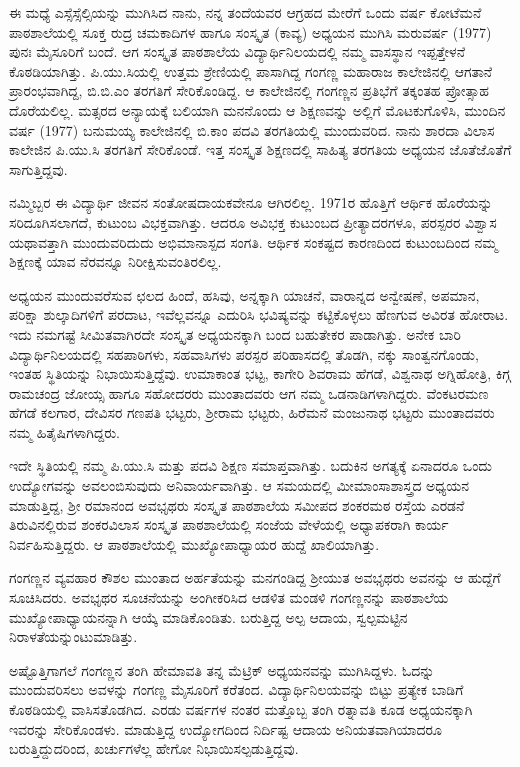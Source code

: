 {ಈ ಮಧ್ಯೆ ಎಸ್ಸೆಸ್ಸೆಲ್ಸಿಯನ್ನು ಮುಗಿಸಿದ ನಾನು, ನನ್ನ ತಂದೆಯವರ ಆಗ್ರಹದ ಮೇರೆಗೆ ಒಂದು ವರ್ಷ ಕೋಟೆಮನೆ ಪಾಠಶಾಲೆಯಲ್ಲಿ ಸೂಕ್ತ  \enginline{-}  ರುದ್ರ  \enginline{-}  ಚಮಕಾದಿಗಳ ಹಾಗೂ ಸಂಸ್ಕೃತ (ಕಾವ್ಯ) ಅಧ್ಯಯನ ಮುಗಿಸಿ ಮರುವರ್ಷ (1977) ಪುನಃ ಮೈಸೂರಿಗೆ ಬಂದೆ. ಆಗ ಸಂಸ್ಕೃತ ಪಾಠಶಾಲೆಯ ವಿದ್ಯಾರ್ಥಿನಿಲಯದಲ್ಲಿ ನಮ್ಮ ವಾಸಸ್ಥಾನ ಇಪ್ಪತ್ತೇಳನೆ ಕೊಠಡಿಯಾಗಿತ್ತು. ಪಿ.ಯು.ಸಿಯಲ್ಲಿ ಉತ್ತಮ ಶ್ರೇಣಿಯಲ್ಲಿ ಪಾಸಾಗಿದ್ದ ಗಂಗಣ್ಣ ಮಹಾರಾಜ ಕಾಲೇಜಿನಲ್ಲಿ ಆಗತಾನೆ ಪ್ರಾರಂಭವಾಗಿದ್ದ, ಬಿ.ಬಿ.ಎಂ ತರಗತಿಗೆ ಸೇರಿಕೊಂಡಿದ್ದ. ಆ ಕಾಲೇಜಿನಲ್ಲಿ ಗಂಗಣ್ಣನ ಪ್ರತಿಭೆಗೆ ತಕ್ಕಂತಹ ಪ್ರೋತ್ಸಾಹ ದೊರೆಯಲಿಲ್ಲ. ಮತ್ಸರದ ಅನ್ಯಾಯಕ್ಕೆ ಬಲಿಯಾಗಿ ಮನನೊಂದು ಆ ಶಿಕ್ಷಣವನ್ನು ಅಲ್ಲಿಗೆ ಮೊಟಕುಗೊಳಿಸಿ, ಮುಂದಿನ ವರ್ಷ (1977) ಬನುಮಯ್ಯ ಕಾಲೇಜಿನಲ್ಲಿ ಬಿ.ಕಾಂ ಪದವಿ ತರಗತಿಯಲ್ಲಿ ಮುಂದುವರಿದ. ನಾನು ಶಾರದಾ ವಿಲಾಸ ಕಾಲೇಜಿನ ಪಿ.ಯು.ಸಿ ತರಗತಿಗೆ ಸೇರಿಕೊಂಡೆ. ಇತ್ತ ಸಂಸ್ಕೃತ ಶಿಕ್ಷಣದಲ್ಲಿ ಸಾಹಿತ್ಯ ತರಗತಿಯ ಅಧ್ಯಯನ ಜೊತೆಜೊತೆಗೆ ಸಾಗುತ್ತಿದ್ದವು. 

ನಮ್ಮಿಬ್ಬರ ಈ ವಿದ್ಯಾರ್ಥಿ ಜೀವನ ಸಂತೋಷದಾಯಕವೇನೂ ಆಗಿರಲಿಲ್ಲ. 1971ರ ಹೊತ್ತಿಗೆ ಆರ್ಥಿಕ ಹೊರೆಯನ್ನು ಸರಿದೂಗಿಸಲಾಗದೆ, ಕುಟುಂಬ	ವಿಭಕ್ತವಾಗಿತ್ತು. ಆದರೂ ಅವಿಭಕ್ತ ಕುಟುಂಬದ ಪ್ರೀತ್ಯಾದರಗಳೂ, ಪರಸ್ಪರರ ವಿಶ್ವಾಸ ಯಥಾವತ್ತಾಗಿ ಮುಂದುವರಿದುದು ಅಭಿಮಾನಾಸ್ಪದ ಸಂಗತಿ. ಆರ್ಥಿಕ ಸಂಕಷ್ಟದ ಕಾರಣದಿಂದ ಕುಟುಂಬದಿಂದ ನಮ್ಮ ಶಿಕ್ಷಣಕ್ಕೆ ಯಾವ ನೆರವನ್ನೂ ನಿರೀಕ್ಷಿಸುವಂತಿರಲಿಲ್ಲ.

ಅಧ್ಯಯನ ಮುಂದುವರೆಸುವ ಛಲದ ಹಿಂದೆ, ಹಸಿವು, ಅನ್ನಕ್ಕಾಗಿ ಯಾಚನೆ, ವಾರಾನ್ನದ ಅನ್ವೇಷಣೆ, ಅಪಮಾನ, ಪರಿಕ್ಷಾ ಶುಲ್ಕಾದಿಗಳಿಗೆ ಪರದಾಟ, ಇವೆಲ್ಲವನ್ನೂ ಎದುರಿಸಿ ಭವಿಷ್ಯವನ್ನು ಕಟ್ಟಿಕೊಳ್ಳಲು ಹೆಣಗುವ ಅವಿರತ ಹೋರಾಟ. ಇದು ನಮಗಷ್ಟೆ ಸೀಮಿತವಾಗಿರದೇ ಸಂಸ್ಕೃತ ಅಧ್ಯಯನಕ್ಕಾಗಿ ಬಂದ ಬಹುತೇಕರ ಪಾಡಾಗಿತ್ತು. ಅನೇಕ ಬಾರಿ ವಿದ್ಯಾರ್ಥಿನಿಲಯದಲ್ಲಿ ಸಹಪಾಠಿಗಳು, ಸಹವಾಸಿಗಳು ಪರಸ್ಪರ ಪರಿಹಾಸದಲ್ಲಿ ತೊಡಗಿ, ನಕ್ಕು ಸಾಂತ್ವನಗೊಂಡು, ಇಂತಹ ಸ್ಥಿತಿಯನ್ನು ನಿಭಾಯಿಸುತ್ತಿದ್ದೆವು. ಉಮಾಕಾಂತ ಭಟ್ಟ, ಕಾಗೇರಿ ಶಿವರಾಮ ಹೆಗಡೆ, ವಿಶ್ವನಾಥ ಅಗ್ನಿಹೋತ್ರಿ, ಕಿಗ್ಗ ರಾಮಚಂದ್ರ ಜೋಯ್ಸ ಹಾಗೂ ಸಹೋದರರು ಮುಂತಾದವರು ಆಗ ನಮ್ಮ ಒಡನಾಡಿಗಳಾಗಿದ್ದರು. ವೆಂಕಟರಮಣ ಹೆಗಡೆ ಕಲಗಾರ, ದೇವಿಸರ ಗಣಪತಿ ಭಟ್ಟರು, ಶ್ರೀರಾಮ ಭಟ್ಟರು, ಹಿರೆಮನೆ ಮಂಜುನಾಥ ಭಟ್ಟರು ಮುಂತಾದವರು ನಮ್ಮ ಹಿತೈಷಿಗಳಾಗಿದ್ದರು.

ಇದೇ ಸ್ಥಿತಿಯಲ್ಲಿ ನಮ್ಮ ಪಿ.ಯು.ಸಿ ಮತ್ತು ಪದವಿ ಶಿಕ್ಷಣ ಸಮಾಪ್ತವಾಗಿತ್ತು. ಬದುಕಿನ ಅಗತ್ಯಕ್ಕೆ ಏನಾದರೂ ಒಂದು  ಉದ್ಯೋಗವನ್ನು ಅವಲಂಬಿಸುವುದು ಅನಿವಾರ್ಯವಾಗಿತ್ತು. ಆ ಸಮಯದಲ್ಲಿ ಮೀಮಾಂಸಾಶಾಸ್ತ್ರದ ಅಧ್ಯಯನ ಮಾಡುತ್ತಿದ್ದ, ಶ್ರೀ ರಮಾನಂದ ಅವಭೃಥರು ಸಂಸ್ಕೃತ ಪಾಠಶಾಲೆಯ ಸಮೀಪದ ಶಂಕರಮಠ ರಸ್ತೆಯ ಎರಡನೆ ತಿರುವಿನಲ್ಲಿರುವ ಶಂಕರವಿಲಾಸ ಸಂಸ್ಕೃತ ಪಾಠಶಾಲೆಯಲ್ಲಿ ಸಂಜೆಯ ವೇಳೆಯಲ್ಲಿ ಅಧ್ಯಾಪಕರಾಗಿ ಕಾರ್ಯ ನಿರ್ವಹಿಸುತ್ತಿದ್ದರು. ಆ ಪಾಠಶಾಲೆಯಲ್ಲಿ ಮುಖ್ಯೋಪಾಧ್ಯಾಯರ ಹುದ್ದೆ ಖಾಲಿಯಾಗಿತ್ತು. 

ಗಂಗಣ್ಣನ ವ್ಯವಹಾರ ಕೌಶಲ ಮುಂತಾದ ಅರ್ಹತೆಯನ್ನು ಮನಗಂಡಿದ್ದ ಶ್ರೀಯುತ ಅವಭೃಥರು ಅವನನ್ನು ಆ ಹುದ್ದೆಗೆ ಸೂಚಿಸಿದರು. ಅವಭೃಥರ ಸೂಚನೆಯನ್ನು ಅಂಗೀಕರಿಸಿದ ಆಡಳಿತ ಮಂಡಳಿ ಗಂಗಣ್ಣನನ್ನು ಪಾಠಶಾಲೆಯ ಮುಖ್ಯೋಪಾಧ್ಯಾಯನನ್ನಾಗಿ ಆಯ್ಕೆ ಮಾಡಿಕೊಂಡಿತು. ಬರುತ್ತಿದ್ದ ಅಲ್ಪ ಆದಾಯ, ಸ್ವಲ್ಪಮಟ್ಟಿನ ನಿರಾಳತೆಯನ್ನುಂಟುಮಾಡಿತ್ತು.

ಅಷ್ಟೊತ್ತಿಗಾಗಲೆ ಗಂಗಣ್ಣನ ತಂಗಿ ಹೇಮಾವತಿ ತನ್ನ ಮೆಟ್ರಿಕ್ ಅಧ್ಯಯನವನ್ನು ಮುಗಿಸಿದ್ದಳು. ಓದನ್ನು ಮುಂದುವರಿಸಲು  ಅವಳನ್ನು ಗಂಗಣ್ಣ ಮೈಸೂರಿಗೆ ಕರೆತಂದ. ವಿದ್ಯಾರ್ಥಿನಿಲಯವನ್ನು ಬಿಟ್ಟು ಪ್ರತ್ಯೇಕ ಬಾಡಿಗೆ ಕೊಠಡಿಯಲ್ಲಿ ವಾಸಿಸತೊಡಗಿದ. ಎರಡು ವರ್ಷಗಳ ನಂತರ ಮತ್ತೊಬ್ಬ ತಂಗಿ ರತ್ನಾವತಿ ಕೂಡ ಅಧ್ಯಯನಕ್ಕಾಗಿ ಇವರನ್ನು ಸೇರಿಕೊಂಡಳು. ಮಾಡುತ್ತಿದ್ದ ಉದ್ಯೋಗದಿಂದ ನಿರ್ದಿಷ್ಟ ಆದಾಯ ಅನಿಯತವಾಗಿಯಾದರೂ ಬರುತ್ತಿದ್ದುದರಿಂದ, ಖರ್ಚುಗಳೆಲ್ಲ ಹೇಗೋ ನಿಭಾಯಿಸಲ್ಪಡುತ್ತಿದ್ದವು.

}
